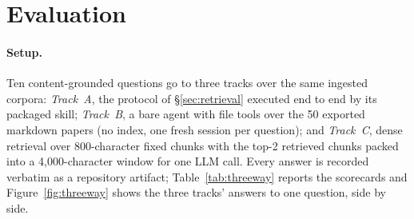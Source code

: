 
\section{Evaluation}
\label{sec:eval}

\paragraph{Setup.}
Ten content-grounded questions go to three tracks over the same
ingested corpora: \emph{Track~A}, the \sys{} protocol of \S\ref{sec:retrieval}
executed end to end by its packaged skill; \emph{Track~B}, a bare agent with
file tools over the 50 exported markdown papers (no index, one fresh session
per question); and \emph{Track~C}, dense retrieval over 800-character fixed
chunks with the top-2 retrieved chunks packed into a 4{,}000-character window
for one LLM call.
Every answer is recorded verbatim as a repository artifact;
Table~\ref{tab:threeway} reports the scorecards and Figure~\ref{fig:threeway}
shows the three tracks' answers to one question, side by side.

